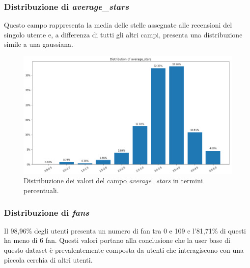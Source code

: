 \documentclass[12pt]{article}
\begin{document}
\subsubsection{Distribuzione di \textit{average\_stars}}
Questo campo rappresenta la media delle stelle assegnate alle recensioni del singolo utente e, a differenza di tutti gli altri campi, presenta una distribuzione simile a una gaussiana.
\begin{figure}[H]
\centering
\includegraphics[width=\textwidth]{images/average_stars_distribution.png}
\caption{Distribuzione dei valori del campo \textit{average\_stars} in termini percentuali.}
\end{figure}

\subsubsection{Distribuzione di \textit{fans}}
Il 98,96\% degli utenti presenta un numero di fan tra 0 e 109 e l'81,71\% di questi ha meno di 6 fan. Questi valori portano alla conclusione che la user base di questo dataset è prevalentemente composta da utenti che interagiscono con una piccola cerchia di altri utenti.
\end{document}
